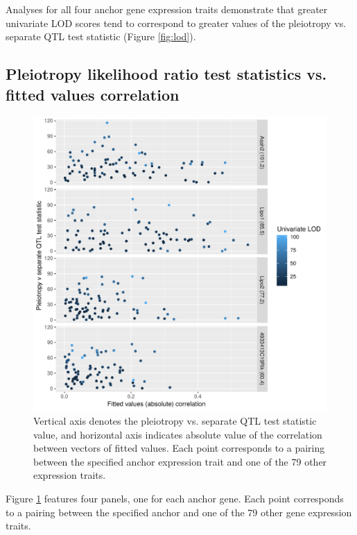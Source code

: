 \documentclass{article}
\begin{document}
Analyses for all four anchor gene expression traits demonstrate that greater univariate LOD scores tend to correspond to greater values of the pleiotropy vs. separate QTL test statistic (Figure \ref{fig:lod}). 








\subsection{Pleiotropy likelihood ratio test statistics vs. fitted values correlation}

\begin{figure}
    \centering
    \includegraphics[width = \textwidth]{../Rmd/lrt-v-corr.pdf}
    \caption{Vertical axis denotes the pleiotropy vs. separate QTL test statistic value, and horizontal axis indicates absolute value of the correlation between vectors of fitted values. Each point corresponds to a pairing between the specified anchor expression trait and one of the 79 other expression traits.}
    \label{fig:cor}
\end{figure}

Figure \ref{fig:cor} features four panels, one for each anchor gene. Each point corresponds to a pairing between the specified anchor and one of the 79 other gene expression traits.
\end{document}
